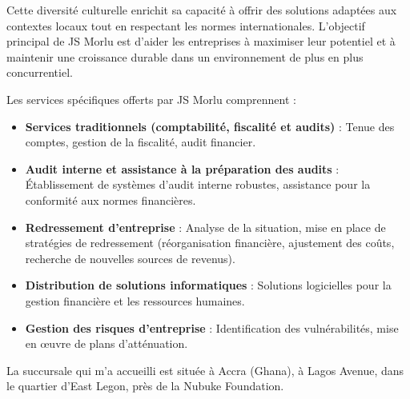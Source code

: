 {\vspace{0.5cm}

Cette diversité culturelle enrichit sa capacité à offrir des solutions adaptées aux contextes locaux tout en respectant les normes internationales. L'objectif principal de JS Morlu est d'aider les entreprises à maximiser leur potentiel et à maintenir une croissance durable dans un environnement de plus en plus concurrentiel.

\vspace{0.5cm}

Les services spécifiques offerts par JS Morlu comprennent :

\vspace{0.3cm}

\begin{itemize}
    \item \textbf{Services traditionnels (comptabilité, fiscalité et audits)} : Tenue des comptes, gestion de la fiscalité, audit financier.

\vspace{0.3cm}

\item \textbf{Audit interne et assistance à la préparation des audits} :
Établissement de systèmes d'audit interne robustes, assistance pour la conformité aux normes financières.

\vspace{0.3cm}

\item \textbf{Redressement d'entreprise} :
Analyse de la situation, mise en place de stratégies de redressement (réorganisation financière, ajustement des coûts, recherche de nouvelles sources de revenus).

\vspace{0.3cm}

\item \textbf{Distribution de solutions informatiques} :
Solutions logicielles pour la gestion financière et les ressources humaines.

\vspace{0.3cm}

\item \textbf{Gestion des risques d'entreprise} :
Identification des vulnérabilités, mise en œuvre de plans d'atténuation.

\end{itemize}

\vspace{0.5cm}

La succursale qui m'a accueilli est située à Accra (Ghana), à Lagos Avenue, dans le quartier d'East Legon, près de la Nubuke Foundation. 

}
